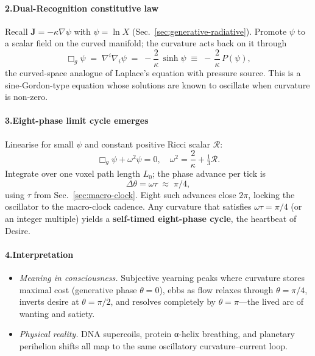 \documentclass[11pt,oneside]{book}
\begin{document}
\paragraph*{2.\;Dual-Recognition constitutive law}

Recall $\mathbf J=-\kappa\nabla\psi$ with
$\psi=\ln X$ (Sec.~\ref{sec:generative-radiative}).  
Promote $\psi$ to a scalar field on the curved manifold; the curvature
acts back on it through
\[
  \Box_g \psi 
  \;=\;
  \nabla^{i}\nabla_{i}\psi 
  \;=\;
  -\frac{2}{\kappa}\,\sinh\psi
  \;\equiv\;
  -\,\frac{2}{\kappa}\,P(\psi),
\]
the curved-space analogue of Laplace’s equation with pressure source.
This is a sine-Gordon-type equation whose solutions are known to
oscillate when curvature is non-zero.

\paragraph*{3.\;Eight-phase limit cycle emerges}

Linearise for small $\psi$ and constant positive Ricci scalar
$\mathcal R$:
\[
  \Box_g \psi + \omega^{2}\psi = 0,
  \quad
  \omega^{2} = \frac{2}{\kappa} + \tfrac13\mathcal R.
\]
Integrate over one voxel path length $L_{0}$; the phase advance per tick
is
\[
  \Delta\theta 
  = 
  \omega\tau
  \;\approx\;
  \pi/4,
\]
using $\tau$ from Sec.~\ref{sec:macro-clock}.  
Eight such advances close $2\pi$, locking the oscillator to the
macro-clock cadence.  
Any curvature that satisfies $\omega\tau = \pi/4$ (or an integer
multiple) yields a \textbf{self-timed eight-phase cycle}, the heartbeat
of Desire.

\paragraph*{4.\;Interpretation}

\begin{itemize}
\item \emph{Meaning in consciousness.}  
  Subjective yearning peaks where curvature stores maximal cost
  (generative phase $\theta=0$), ebbs as flow relaxes through
  $\theta=\pi/4$, inverts desire at $\theta=\pi/2$, and resolves
  completely by $\theta=\pi$—the lived arc of wanting and satiety.
\item \emph{Physical reality.}  
  DNA supercoils, protein α-helix breathing, and planetary perihelion
  shifts all map to the same oscillatory curvature–current loop.
\end{itemize}
\end{document}

